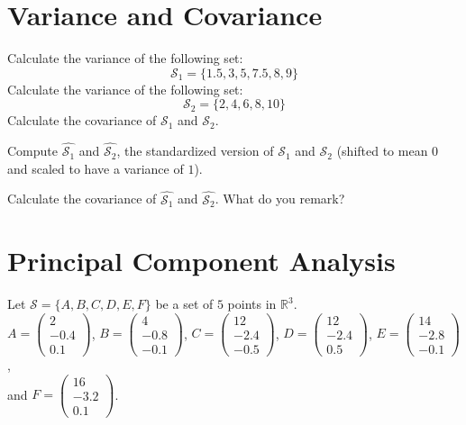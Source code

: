 \documentclass[]{article}
\begin{document}
	\section{Variance and Covariance}
	Calculate the variance of the following set:
	$$
	\mathcal{S}_1 = \{ 1.5, 3, 5, 7.5, 8, 9 \}
	$$
	Calculate the variance of the following set:
	$$
	\mathcal{S}_2 = \{ 2, 4, 6, 8, 10 \}
	$$
	Calculate the covariance of $\mathcal{S}_1$ and $\mathcal{S}_2$.
	
	Compute $\hat{\mathcal{S}_1}$ and $\hat{\mathcal{S}_2}$, the standardized version of $\mathcal{S}_1$ and $\mathcal{S}_2$ (shifted to mean $0$ and scaled to have a variance of $1$).
	
	Calculate the covariance of $\hat{\mathcal{S}_1}$ and $\hat{\mathcal{S}_2}$. What do you remark?

	\section{Principal Component Analysis}
	Let $\mathcal{S} = \{ A, B, C, D, E, F \}$ be a set of $5$ points in $\mathbb{R}^3$.\\
	$A = \begin{pmatrix} 2 \\ -0.4 \\ 0.1 \end{pmatrix}$,
	$B = \begin{pmatrix} 4 \\ -0.8 \\ -0.1 \end{pmatrix}$,
	$C = \begin{pmatrix} 12 \\ -2.4 \\ -0.5 \end{pmatrix}$,
	$D = \begin{pmatrix} 12 \\ -2.4 \\ 0.5 \end{pmatrix}$,
	$E = \begin{pmatrix} 14 \\ -2.8 \\ -0.1 \end{pmatrix}$,\\
	and $F = \begin{pmatrix} 16 \\ -3.2 \\ 0.1 \end{pmatrix}$.
	
\end{document}
